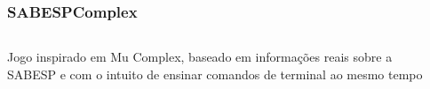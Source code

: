 \documentclass{beamer}
\begin{document}
\begin{frame}
  \frametitle{SABESPComplex}
  \begin{columns}
    \begin{column}{0.5\textwidth}
      Jogo inspirado em Mu Complex, baseado em informações reais sobre a SABESP e com o intuito de ensinar comandos de terminal ao mesmo tempo
    \end{column}
    \begin{column}{0.5\textwidth}
    \end{column}
  \end{columns}
\end{frame}
\end{document}
